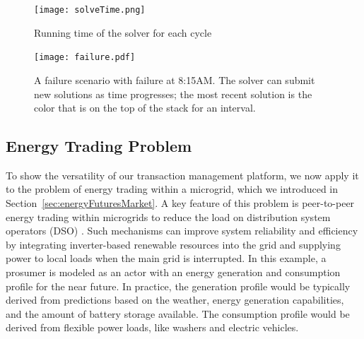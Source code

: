 \begin{figure}[t]
    \centering
\texttt{[image: solveTime.png]}
    \caption{ Running time of the solver for each cycle}
    \label{fig:solve-time}
\end{figure}
\fi
\begin{figure} [h]
    \centering
    \texttt{[image: failure.pdf]}
    \caption{A failure scenario with failure at 8:15AM. The solver can submit new solutions as time progresses; the most recent solution is the color that is on the top of the stack for an interval.}
    \label{fig:failure}
    \vspace{-0.05in}
\end{figure}





\subsection{Energy Trading Problem}
 \label{sec:energy}

  To show the versatility of our transaction management platform, we now apply it to the problem of energy trading  within a microgrid, which we introduced in Section~\ref{sec:energyFuturesMarket}.
\ifExtended
  A key feature of this problem is peer-to-peer energy trading within microgrids to reduce the load on  distribution system operators (DSO) \cite{kok2016society,cox2013structured,melton2013gridwise}.  Such mechanisms can improve system reliability and efficiency by integrating inverter-based renewable resources into the grid and  supplying power to local loads when the main grid is interrupted.
  \fi
%  
  In this example, a prosumer is modeled as an actor with an energy generation and consumption profile for the near future. In practice, the generation profile would be typically derived from predictions based on the weather, energy generation capabilities, and the amount of battery storage available. The consumption profile would be derived from flexible power loads, like  washers and electric vehicles.  

